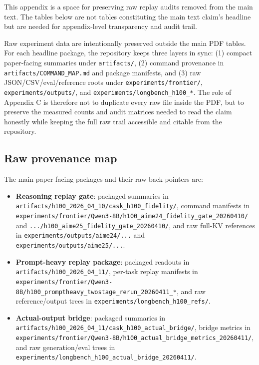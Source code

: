 This appendix is a space for preserving raw replay audits removed from the main text. The tables below are not tables constituting the main text claim's headline but are needed for appendix-level transparency and audit trail.


Raw experiment data are intentionally preserved outside the main PDF tables. For each headline package, the repository keeps three layers in sync: (1) compact paper-facing summaries under \texttt{artifacts/}, (2) command provenance in \texttt{artifacts/COMMAND\_MAP.md} and package manifests, and (3) raw JSON/CSV/eval/reference roots under \texttt{experiments/frontier/}, \texttt{experiments/outputs/}, and \texttt{experiments/longbench\_h100\_*}. The role of Appendix C is therefore not to duplicate every raw file inside the PDF, but to preserve the measured counts and audit matrices needed to read the claim honestly while keeping the full raw trail accessible and citable from the repository.


\subsection{Raw provenance map}


The main paper-facing packages and their raw back-pointers are:


\begin{itemize}
\item \textbf{Reasoning replay gate}: packaged summaries in \texttt{artifacts/h100\_2026\_04\_10/cask\_h100\_fidelity/}, command manifests in \texttt{experiments/frontier/Qwen3-8B/h100\_aime24\_fidelity\_gate\_20260410/} and \texttt{.../h100\_aime25\_fidelity\_gate\_20260410/}, and raw full-KV references in \texttt{experiments/outputs/aime24/...} and \texttt{experiments/outputs/aime25/...}.
\item \textbf{Prompt-heavy replay package}: packaged readouts in \texttt{artifacts/h100\_2026\_04\_11/}, per-task replay manifests in \texttt{experiments/frontier/Qwen3-8B/h100\_promptheavy\_twostage\_rerun\_20260411\_*}, and raw reference/output trees in \texttt{experiments/longbench\_h100\_refs/}.
\item \textbf{Actual-output bridge}: packaged summaries in \texttt{artifacts/h100\_2026\_04\_11/cask\_h100\_actual\_bridge/}, bridge metrics in \texttt{experiments/frontier/Qwen3-8B/h100\_actual\_bridge\_metrics\_20260411/}, and raw generation/eval trees in \texttt{experiments/longbench\_h100\_actual\_bridge\_20260411/}.
\end{itemize}


